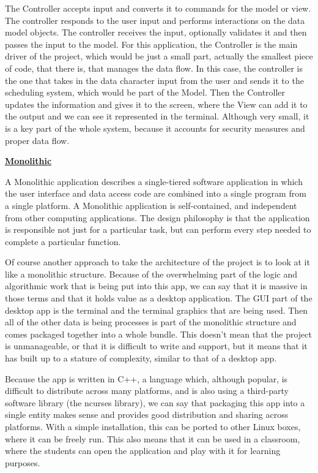 \documentclass{article}
\begin{document}
The Controller accepts input and converts it to commands for the model or view. The controller responds to the user input and performs interactions on the data model objects. The controller receives the input, optionally validates it and then passes the input to the model. For this application, the Controller is the main driver of the project, which would be just a small part, actually the smallest piece of code, that there is, that manages the data flow. In this case, the controller is the one that takes in the data character input from the user and sends it to the scheduling system, which would be part of the Model. Then the Controller updates the information and gives it to the screen, where the View can add it to the output and we can see it represented in the terminal. Although very small, it is a key part of the whole system, because it accounts for security measures and proper data flow.

\bigskip

\textbf{\underline{Monolithic}}

A Monolithic application describes a single-tiered software application in which the user interface and data access code are combined into a single program from a single platform. A Monolithic application is self-contained, and independent from other computing applications. The design philosophy is that the application is responsible not just for a particular task, but can perform every step needed to complete a particular function.

Of course another approach to take the architecture of the project is to look at it like a monolithic structure. Because of the overwhelming part of the logic and algorithmic work that is being put into this app, we can say that it is massive in those terms and that it holds value as a desktop application. The GUI part of the desktop app is the terminal and the terminal graphics that are being used. Then all of the other data is being processes is part of the monolithic structure and comes packaged together into a whole bundle. This doesn't mean that the project is unmanageable, or that it is difficult to write and support, but it means that it has built up to a stature of complexity, similar to that of a desktop app.

Because the app is written in C++, a language which, although popular, is difficult to distribute across many platforms, and is also using a third-party software library (the ncurses library), we can say that packaging this app into a single entity makes sense and provides good distribution and sharing across platforms. With a simple installation, this can be ported to other Linux boxes, where it can be freely run. This also means that it can be used in a classroom, where the students can open the application and play with it for learning purposes.
\end{document}
